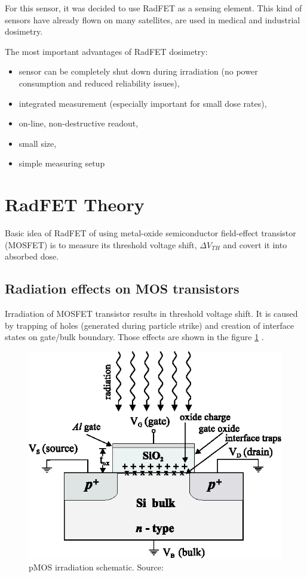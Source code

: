     For this sensor, it was decided to use RadFET as a sensing element. This kind of sensors have already flown on many satellites, are used in medical and industrial dosimetry.

    The most important advantages of RadFET dosimetry:
    \begin{itemize}
        \item sensor can be completely shut down during irradiation (no power consumption and reduced reliability issues),
        \item integrated measurement (especially important for small dose rates),
        \item on-line, non-destructive readout,
        \item small size,
        \item simple measuring setup
    \end{itemize}

\section{RadFET Theory}
    Basic idea of RadFET of using metal-oxide semiconductor field-effect transistor (MOSFET) is to measure its threshold voltage shift, $\Delta V_{TH}$ and covert it into absorbed dose.

    \subsection{Radiation effects on MOS transistors}
    \label{Radiation_effects_on_MOS_transistors}
        Irradiation of MOSFET transistor results in threshold voltage shift. It is caused by trapping of holes (generated during particle strike) and creation of interface states on gate/bulk boundary. Those effects are shown in the figure \ref{MOS_irradiation} \cite{pMOS_dosimeters_radfets}.

        \begin{figure}[H]
            \centering
            \includegraphics[width=0.4\paperwidth]{img/03/MOS_irradiation_schematic.eps}
            \caption{pMOS irradiation schematic. Source: \cite{pMOS_dosimeters_radfets}}
            \label{MOS_irradiation}
        \end{figure}

